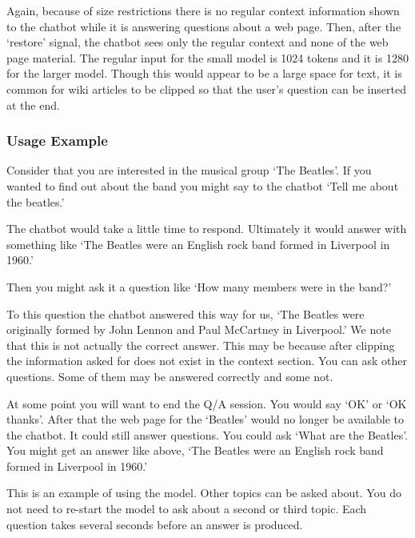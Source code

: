 Again, because of size restrictions there is no regular context information shown to the chatbot while it is answering questions about a web page. Then, after the `restore' signal, the chatbot sees only the regular context and none of the web page material. The regular input for the small model is 1024 tokens and it is 1280 for the larger model. Though this would appear to be a large space for text, it is common for wiki articles to be clipped so that the user's question can be inserted at the end.

\subsubsection{Usage Example}

Consider that you are interested in the musical group `The Beatles'. If you wanted to find out about the band you might say to the chatbot `Tell me about the beatles.'

The chatbot would take a little time to respond. Ultimately it would answer with something like `The Beatles were an English rock band formed in Liverpool in 1960.'

Then you might ask it a question like `How many members were in the band?'

To this question the chatbot answered this way for us, `The Beatles were originally formed by John Lennon and Paul McCartney in Liverpool.' We note that this is not actually the correct answer. This may be because after clipping the information asked for does not exist in the context section. You can ask other questions. Some of them may be answered correctly and some not. 

At some point you will want to end the Q/A session. You would say `OK' or `OK thanks'. After that the web page for the `Beatles' would no longer be available to the chatbot. It could still answer questions. You could ask `What are the Beatles'. You might get an answer like above, `The Beatles were an English rock band formed in Liverpool in 1960.'

This is an example of using the model. Other topics can be asked about. You do not need to re-start the model to ask about a second or third topic. Each question takes several seconds before an answer is produced.